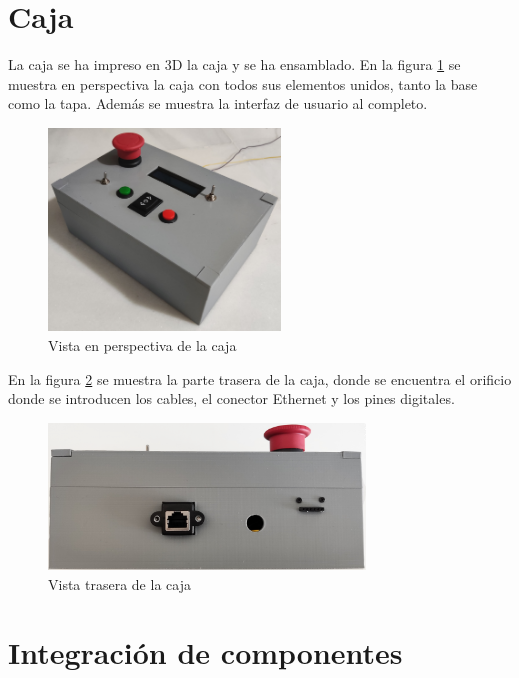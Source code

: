 \section{Caja}

La caja se ha impreso en 3D la caja y se ha ensamblado. En la figura \ref{fig:cajaexterior} se muestra en perspectiva la caja con todos sus elementos unidos, tanto la base como la tapa. Además se muestra la interfaz de usuario al completo.

\begin{figure}[hbtp]%
    \centering 
        \includegraphics[width=0.55\textwidth]{07-resultados/cajaexterior.jpg}
    \caption{Vista en perspectiva de la caja}
    \label{fig:cajaexterior} 
\end{figure}

En la figura \ref{fig:cajatrasero} se muestra la parte trasera de la caja, donde se encuentra
el orificio donde se introducen los cables, el conector Ethernet y los pines digitales.

\begin{figure}[hbtp]%
    \centering 
        \includegraphics[width=0.75\textwidth]{07-resultados/cajatrasero.jpg}
    \caption{Vista trasera de la caja}
    \label{fig:cajatrasero} 
\end{figure}



\section{Integración de componentes}

